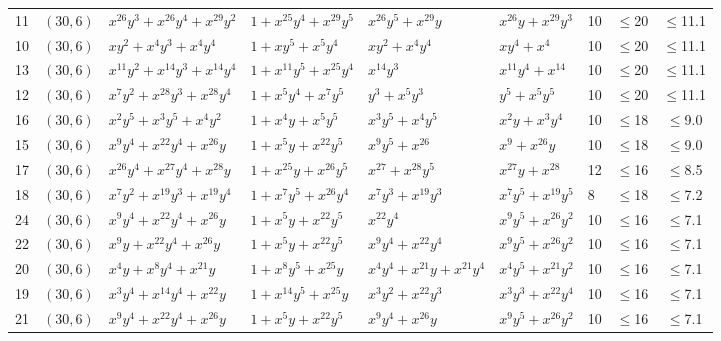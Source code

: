 \begin{table}[t]
\begin{tabular*}{\textwidth}{@{\extracolsep{\fill}}cllllllcc}
11 & $(30,6)$ & $x^{26}y^{3}{+}x^{26}y^{4}{+}x^{29}y^{2}$ & $1{+}x^{25}y^{4}{+}x^{29}y^{5}$ & $x^{26}y^{5}{+}x^{29}y$ & $x^{26}y{+}x^{29}y^{3}$ & 10 & $\leq$20 & $\leq$11.1 \\
10 & $(30,6)$ & $xy^{2}{+}x^{4}y^{3}{+}x^{4}y^{4}$ & $1{+}xy^{5}{+}x^{5}y^{4}$ & $xy^{2}{+}x^{4}y^{4}$ & $xy^{4}{+}x^{4}$ & 10 & $\leq$20 & $\leq$11.1 \\
13 & $(30,6)$ & $x^{11}y^{2}{+}x^{14}y^{3}{+}x^{14}y^{4}$ & $1{+}x^{11}y^{5}{+}x^{25}y^{4}$ & $x^{14}y^{3}$ & $x^{11}y^{4}{+}x^{14}$ & 10 & $\leq$20 & $\leq$11.1 \\
12 & $(30,6)$ & $x^{7}y^{2}{+}x^{28}y^{3}{+}x^{28}y^{4}$ & $1{+}x^{5}y^{4}{+}x^{7}y^{5}$ & $y^{3}{+}x^{5}y^{3}$ & $y^{5}{+}x^{5}y^{5}$ & 10 & $\leq$20 & $\leq$11.1 \\
16 & $(30,6)$ & $x^{2}y^{5}{+}x^{3}y^{5}{+}x^{4}y^{2}$ & $1{+}x^{4}y{+}x^{5}y^{5}$ & $x^{3}y^{5}{+}x^{4}y^{5}$ & $x^{2}y{+}x^{3}y^{4}$ & 10 & $\leq$18 & $\leq$9.0 \\
15 & $(30,6)$ & $x^{9}y^{4}{+}x^{22}y^{4}{+}x^{26}y$ & $1{+}x^{5}y{+}x^{22}y^{5}$ & $x^{9}y^{5}{+}x^{26}$ & $x^{9}{+}x^{26}y$ & 10 & $\leq$18 & $\leq$9.0 \\
17 & $(30,6)$ & $x^{26}y^{4}{+}x^{27}y^{4}{+}x^{28}y$ & $1{+}x^{25}y{+}x^{26}y^{5}$ & $x^{27}{+}x^{28}y^{5}$ & $x^{27}y{+}x^{28}$ & 12 & $\leq$16 & $\leq$8.5 \\
18 & $(30,6)$ & $x^{7}y^{2}{+}x^{19}y^{3}{+}x^{19}y^{4}$ & $1{+}x^{7}y^{5}{+}x^{26}y^{4}$ & $x^{7}y^{3}{+}x^{19}y^{3}$ & $x^{7}y^{5}{+}x^{19}y^{5}$ & 8 & $\leq$18 & $\leq$7.2 \\
24 & $(30,6)$ & $x^{9}y^{4}{+}x^{22}y^{4}{+}x^{26}y$ & $1{+}x^{5}y{+}x^{22}y^{5}$ & $x^{22}y^{4}$ & $x^{9}y^{5}{+}x^{26}y^{2}$ & 10 & $\leq$16 & $\leq$7.1 \\
22 & $(30,6)$ & $x^{9}y{+}x^{22}y^{4}{+}x^{26}y$ & $1{+}x^{5}y{+}x^{22}y^{5}$ & $x^{9}y^{4}{+}x^{22}y^{4}$ & $x^{9}y^{5}{+}x^{26}y^{2}$ & 10 & $\leq$16 & $\leq$7.1 \\
20 & $(30,6)$ & $x^{4}y{+}x^{8}y^{4}{+}x^{21}y$ & $1{+}x^{8}y^{5}{+}x^{25}y$ & $x^{4}y^{4}{+}x^{21}y{+}x^{21}y^{4}$ & $x^{4}y^{5}{+}x^{21}y^{2}$ & 10 & $\leq$16 & $\leq$7.1 \\
19 & $(30,6)$ & $x^{3}y^{4}{+}x^{14}y^{4}{+}x^{22}y$ & $1{+}x^{14}y^{5}{+}x^{25}y$ & $x^{3}y^{2}{+}x^{22}y^{3}$ & $x^{3}y^{3}{+}x^{22}y^{4}$ & 10 & $\leq$16 & $\leq$7.1 \\
21 & $(30,6)$ & $x^{9}y^{4}{+}x^{22}y^{4}{+}x^{26}y$ & $1{+}x^{5}y{+}x^{22}y^{5}$ & $x^{9}y^{4}{+}x^{26}y$ & $x^{9}y^{5}{+}x^{26}y^{2}$ & 10 & $\leq$16 & $\leq$7.1 \\

\end{tabular*}
\end{table}
